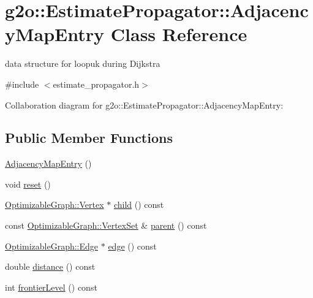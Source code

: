 \hypertarget{classg2o_1_1EstimatePropagator_1_1AdjacencyMapEntry}{}\section{g2o\+:\+:Estimate\+Propagator\+:\+:Adjacency\+Map\+Entry Class Reference}
\label{classg2o_1_1EstimatePropagator_1_1AdjacencyMapEntry}


data structure for loopuk during Dijkstra  




{\ttfamily \#include $<$estimate\+\_\+propagator.\+h$>$}



Collaboration diagram for g2o\+:\+:Estimate\+Propagator\+:\+:Adjacency\+Map\+Entry\+:
\subsection*{Public Member Functions}
\begin{DoxyCompactItemize}
\item 
\hyperlink{classg2o_1_1EstimatePropagator_1_1AdjacencyMapEntry_a5fe6ab271c62be13c363ea3807e6d357}{Adjacency\+Map\+Entry} ()
\item 
void \hyperlink{classg2o_1_1EstimatePropagator_1_1AdjacencyMapEntry_a6d2f95439aa6ee608f2e2d110de553e8}{reset} ()
\item 
\hyperlink{classg2o_1_1OptimizableGraph_1_1Vertex}{Optimizable\+Graph\+::\+Vertex} $\ast$ \hyperlink{classg2o_1_1EstimatePropagator_1_1AdjacencyMapEntry_a18950202077ae522b96798e7413f87d8}{child} () const 
\item 
const \hyperlink{classg2o_1_1HyperGraph_a703938cdb4bb636860eed55a2489d70c}{Optimizable\+Graph\+::\+Vertex\+Set} \& \hyperlink{classg2o_1_1EstimatePropagator_1_1AdjacencyMapEntry_aee0f4d6633710a78e9db0da72fbc4160}{parent} () const 
\item 
\hyperlink{classg2o_1_1OptimizableGraph_1_1Edge}{Optimizable\+Graph\+::\+Edge} $\ast$ \hyperlink{classg2o_1_1EstimatePropagator_1_1AdjacencyMapEntry_a60bf7d0054f60b3b97cb6ddbb4e6822e}{edge} () const 
\item 
double \hyperlink{classg2o_1_1EstimatePropagator_1_1AdjacencyMapEntry_a6d09d8c8149ccebebda9bb4f93da475d}{distance} () const 
\item 
int \hyperlink{classg2o_1_1EstimatePropagator_1_1AdjacencyMapEntry_aa198f0e42ac773dc34a42ab9b75d3a08}{frontier\+Level} () const 
\end{DoxyCompactItemize}
